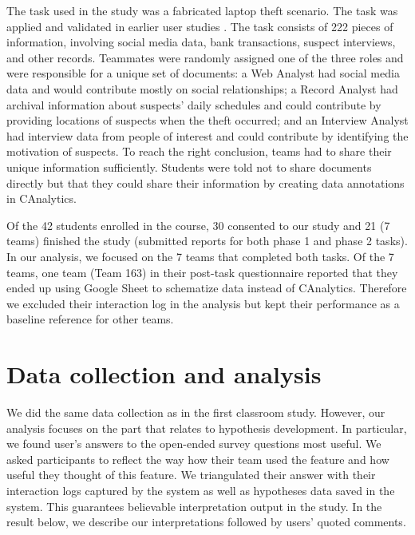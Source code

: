 The task used in the study was a fabricated laptop theft scenario. The task was applied and validated in earlier user studies \citep{Carroll2013, Borge2012}. The task consists of 222 pieces of information, involving social media data, bank transactions, suspect interviews, and other records. Teammates were randomly assigned one of the three roles and were responsible for a unique set of documents: a Web Analyst had social media data and would contribute mostly on social relationships; a Record Analyst had archival information about suspects' daily schedules and could contribute by providing locations of suspects when the theft occurred; and an Interview Analyst had interview data from people of interest and could contribute by identifying the motivation of suspects. To reach the right conclusion, teams had to share their unique information sufficiently. Students were told not to share documents directly but that they could share their information by creating data annotations in CAnalytics.

Of the 42 students enrolled in the course, 30 consented to our study and 21 (7 teams) finished the study (submitted reports for both phase 1 and phase 2 tasks). In our analysis, we focused on the 7 teams that completed both tasks. Of the 7 teams, one team (Team 163) in their post-task questionnaire reported that they ended up using Google Sheet to schematize data instead of CAnalytics. Therefore we excluded their interaction log in the analysis but kept their performance as a baseline reference for other teams.


\section{Data collection and analysis}

We did the same data collection as in the first classroom study. However, our analysis focuses on the part that relates to hypothesis development. In particular, we found user's answers to the open-ended survey questions most useful.  We asked participants to reflect the way how their team used the feature and how useful they thought of this feature. We triangulated their answer with their interaction logs captured by the system as well as hypotheses data saved in the system. This guarantees believable interpretation output in the study. In the result below, we describe our interpretations followed by users’ quoted comments. 